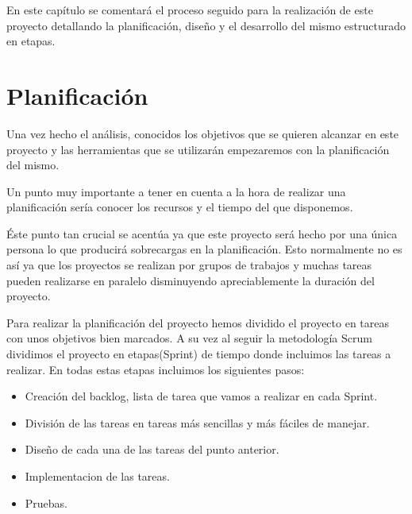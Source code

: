 

 En este capítulo se comentará el proceso seguido para la realización de este proyecto detallando la planificación, diseño y el desarrollo del mismo estructurado en etapas.
 
\section{Planificación}

Una vez hecho el análisis, conocidos los objetivos que se quieren alcanzar en este proyecto y las herramientas que se utilizarán  empezaremos con la planificación del mismo.

Un punto muy  importante a tener en cuenta a la hora de realizar una planificación sería conocer los recursos y el tiempo del que disponemos.




Éste punto tan crucial se acentúa ya que este proyecto será hecho por una única persona lo que producirá sobrecargas en la planificación. Esto normalmente no es así ya que los proyectos se realizan por grupos de trabajos y muchas tareas pueden realizarse en paralelo disminuyendo apreciablemente la duración del proyecto.

Para realizar la planificación del proyecto hemos dividido el proyecto en tareas con unos objetivos bien marcados. A su vez al seguir la metodología Scrum dividimos el proyecto en etapas(Sprint) de tiempo  donde incluimos las tareas a realizar.
En todas estas etapas incluimos los siguientes pasos:
 
 


\begin{itemize}
\item Creación del  backlog, lista de tarea que vamos a realizar en cada Sprint.




\item  División de las tareas en tareas más sencillas y más fáciles de manejar.



\item Diseño de cada una de las tareas del punto anterior.
\item  Implementacion de las tareas.
\item Pruebas.
\end{itemize}



